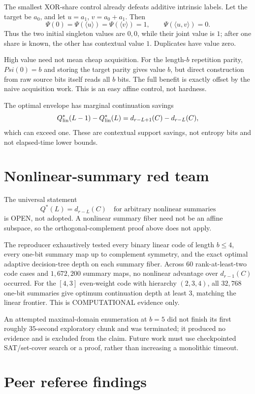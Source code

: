 \documentclass[11pt]{article}
\newcommand{\status}[1]{\textsc{#1}}
\begin{document}
The smallest XOR-share control already defeats additive intrinsic labels.  Let the target be $a_0$, and let $u=a_1$, $v=a_0+a_1$.  Then
\[
\Psi(0)=\Psi(\langle u\rangle)=\Psi(\langle v\rangle)=1,
\qquad
\Psi(\langle u,v\rangle)=0.
\]
Thus the two initial singleton values are $0,0$, while their joint value is $1$; after one share is known, the other has contextual value $1$.  Duplicates have value zero.

High value need not mean cheap acquisition.  For the length-$b$ repetition parity, $Psi(0)=b$ and storing the target parity gives value $b$, but direct construction from raw source bits itself reads all $b$ bits.  The full benefit is exactly offset by the naive acquisition work.  This is an easy affine control, not hardness.

The optimal envelope has marginal continuation savings
\[
Q^*_{\rm lin}(L-1)-Q^*_{\rm lin}(L)
=d_{r-L+1}(C)-d_{r-L}(C),
\]
which can exceed one.  These are contextual support savings, not entropy bits and not elapsed-time lower bounds.

\section{Nonlinear-summary red team}

The universal statement
\[
Q^*(L)=d_{r-L}(C)\quad\text{for arbitrary nonlinear summaries}
\]
is \status{OPEN}, not adopted.  A nonlinear summary fiber need not be an affine subspace, so the orthogonal-complement proof above does not apply.

The reproducer exhaustively tested every binary linear code of length $b\le4$, every one-bit summary map up to complement symmetry, and the exact optimal adaptive decision-tree depth on each summary fiber.  Across $60$ rank-at-least-two code cases and $1{,}672{,}200$ summary maps, no nonlinear advantage over $d_{r-1}(C)$ occurred.  For the $[4,3]$ even-weight code with hierarchy $(2,3,4)$, all $32{,}768$ one-bit summaries give optimum continuation depth at least $3$, matching the linear frontier.  This is \status{COMPUTATIONAL} evidence only.

An attempted maximal-domain enumeration at $b=5$ did not finish its first roughly $35$-second exploratory chunk and was terminated; it produced no evidence and is excluded from the claim.  Future work must use checkpointed SAT/set-cover search or a proof, rather than increasing a monolithic timeout.

\section{Peer referee findings}
\end{document}
